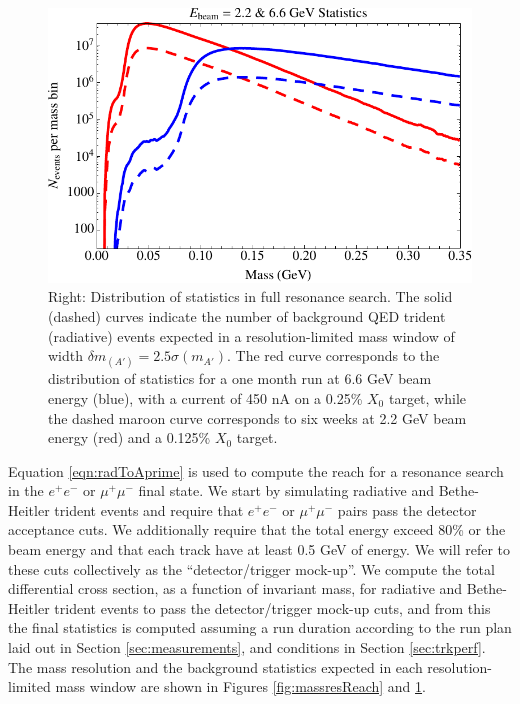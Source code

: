 \begin{figure}
\includegraphics[scale=1.0]{reach/TotalStats.pdf}
\caption{Right: Distribution of statistics in full resonance search.
  The solid (dashed) curves indicate the number of background QED trident (radiative) events expected in a 
  resolution-limited mass window of width $\delta m_(A' )=2.5 \sigma (m_{A'})$.  The red 
curve corresponds to the distribution of statistics for a one month run at 6.6 GeV 
beam energy (blue), with a current of 450 nA on a 0.25\% $X_0$ target, while the dashed maroon 
curve corresponds to six weeks  at 2.2 GeV beam energy (red) and a 0.125\% $X_0$ target.}
\label{fig:totalStats}
\end{figure} 
%

Equation \ref{eqn:radToAprime} is used to compute the reach for a resonance search in the $e^+ e^-$ or 
$\mu^+ \mu^-$ final state. We start by simulating radiative and Bethe-Heitler trident 
events and require that $e^+ e^-$ or $\mu^+ \mu^-$ pairs pass the detector acceptance cuts. 
We additionally require that the total energy exceed 80\% or the beam energy and that each 
track have at least 0.5 GeV of energy. We will refer to these cuts collectively as the 
``detector/trigger mock-up''. We compute the total differential cross section, as 
a function of invariant mass, for radiative and Bethe-Heitler trident events to pass the 
detector/trigger mock-up cuts, and from this the final statistics is computed assuming 
a run duration according to the run plan laid out in Section \ref{sec:measurements}, and conditions in Section \ref{sec:trkperf}.
The  mass resolution  and the background statistics expected in each resolution-limited mass window are shown 
in Figures \ref{fig:massresReach} and \ref{fig:totalStats}.


